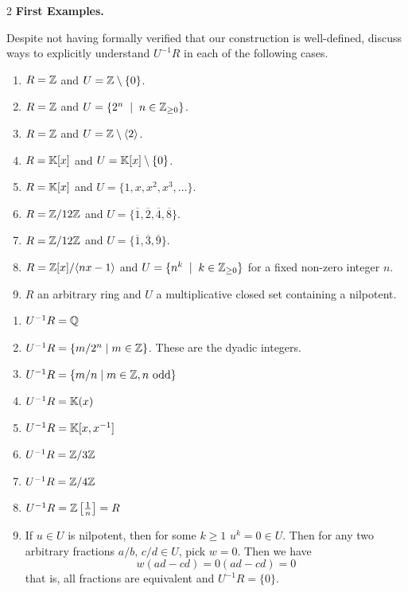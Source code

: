 \documentclass[Notebook.tex]{subfiles}
\begin{document}
\begin{problem}{2}
	\textbf{First Examples.} 
	
	Despite not having formally verified that our construction is well-defined, discuss ways to explicitly understand $U^{-1}R$ in each of the following cases. 
	\begin{enumerate}
		\item $R=\mathbb Z$ and $U=\mathbb Z\setminus\{0\}$.
		\item $R=\mathbb Z$ and $U=\{2^{n}\;\;|\;\; n\in \mathbb Z_{\geq0}\}$.
		\item $R=\mathbb Z$ and $U=\mathbb Z\setminus\langle 2 \rangle$.
		\item $R=\mathbb K[x]$ and $U=\mathbb K[x]\setminus\{0\}$.
		\item $R=\mathbb K[x]$ and $U=\{1,x,x^2,x^3,\ldots\}$.
		\item $R=\mathbb Z/12\mathbb Z$ and $U=\{\overline{1},\overline{2},\overline{4},\overline{8}\}$.
		\item $R=\mathbb Z/12\mathbb Z$ and $U=\{\overline{1},\overline{3},\overline{9}\}$.
		\item $R=\mathbb Z[x]/\langle nx-1\rangle$ and $U=\{n^k \;\; | \;\; k \in \mathbb Z_{\geq0}\}$ for a fixed non-zero integer $n$.
		\item\label{ex-pt:localize-nilpotent} $R$ an arbitrary ring and $U$ a multiplicative closed set containing a nilpotent. 
	\end{enumerate}
\end{problem}

\begin{solution}
	\bbni
	\begin{enumerate}
		\item $U^{-1}R = \mathbb Q$ 
		\item $U^{-1}R = \{m/2^n \mid m \in \mathbb Z\}$. These are the dyadic integers. 
		\item $U^{-1}R = \{m/n \mid m \in \mathbb Z, n \text{ odd}\}$
		\item $U^{-1}R = \mathbb K(x)$
		\item $U^{-1}R = \mathbb K[x, x^{-1}]$
		\item $U^{-1}R = \mathbb Z/3\mathbb Z$
		\item $U^{-1}R = \mathbb Z/4\mathbb Z$
		\item $U^{-1}R = \mathbb Z\left[\frac{1}{n}\right] = R$ 
		\item If $u \in U$ is nilpotent, then for some $k \geq 1$ $u^k = 0 \in U$. Then for any two arbitrary fractions $a/b, \, c/d \in U$, pick $w = 0$. Then we have
		\[w(ad - cd) = 0 (ad - cd) = 0\]
		that is, all fractions are equivalent and $U^{-1}R = \{0\}$. 
	\end{enumerate}
\end{solution}
\end{document}
